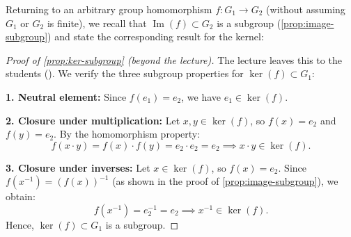 \begin{content}

Returning to an arbitrary group homomorphism $f \colon G_1 \to G_2$ (without assuming $G_1$ or $G_2$ is finite), we recall that $\operatorname{Im}(f) \subset G_2$ is a subgroup (\cref{prop:image-subgroup}) and state the corresponding result for the kernel:



\begin{proof}[Proof of \cref{prop:ker-subgroup} (beyond the lecture)]
The lecture leaves this to the students (). We verify the three subgroup properties for $\ker(f) \subset G_1$:

\textbf{1. Neutral element:} Since $f(e_1) = e_2$, we have $e_1 \in \ker(f)$.

\textbf{2. Closure under multiplication:} Let $x, y \in \ker(f)$, so $f(x) = e_2$ and $f(y) = e_2$. By the homomorphism property:
\[
f(x \cdot y) = f(x) \cdot f(y) = e_2 \cdot e_2 = e_2 \implies x \cdot y \in \ker(f).
\]

\textbf{3. Closure under inverses:} Let $x \in \ker(f)$, so $f(x) = e_2$. Since $f(x^{-1}) = (f(x))^{-1}$ (as shown in the proof of \cref{prop:image-subgroup}), we obtain:
\[
f(x^{-1}) = e_2^{-1} = e_2 \implies x^{-1} \in \ker(f).
\]
Hence, $\ker(f) \subset G_1$ is a subgroup.
\end{proof}
\end{content}

